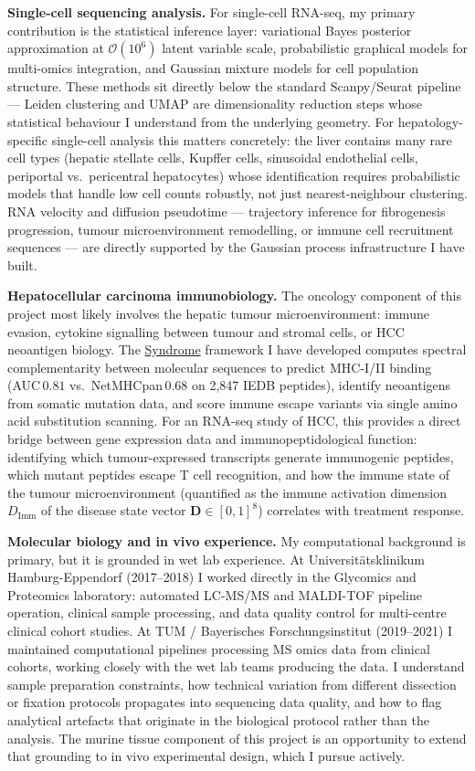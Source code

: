 \documentclass[12pt,a4paper]{article}
\begin{document}
\textbf{Single-cell sequencing analysis.}
For single-cell RNA-seq, my primary contribution is the statistical
inference layer: variational Bayes posterior approximation at
$\mathcal{O}(10^6)$ latent variable scale, probabilistic graphical
models for multi-omics integration, and Gaussian mixture models for
cell population structure.
These methods sit directly below the standard Scanpy/Seurat pipeline ---
Leiden clustering and UMAP are dimensionality reduction steps whose
statistical behaviour I understand from the underlying geometry.
For hepatology-specific single-cell analysis this matters concretely:
the liver contains many rare cell types (hepatic stellate cells,
Kupffer cells, sinusoidal endothelial cells, periportal vs.\ pericentral
hepatocytes) whose identification requires probabilistic models that
handle low cell counts robustly, not just nearest-neighbour clustering.
RNA velocity and diffusion pseudotime --- trajectory inference for
fibrogenesis progression, tumour microenvironment remodelling, or
immune cell recruitment sequences --- are directly supported by the
Gaussian process infrastructure I have built.

\textbf{Hepatocellular carcinoma immunobiology.}
The oncology component of this project most likely involves the
hepatic tumour microenvironment: immune evasion, cytokine signalling
between tumour and stromal cells, or HCC neoantigen biology.
The \href{https://syndrome-seven.vercel.app/tools}{Syndrome} framework
I have developed computes spectral complementarity between molecular
sequences to predict MHC-I/II binding (AUC\,$0.81$ vs.\ NetMHCpan\,$0.68$
on 2,847 IEDB peptides), identify neoantigens from somatic mutation
data, and score immune escape variants via single amino acid substitution scanning.
For an RNA-seq study of HCC, this provides a direct bridge between
gene expression data and immunopeptidological function: identifying
which tumour-expressed transcripts generate immunogenic peptides,
which mutant peptides escape T cell recognition, and how the immune
state of the tumour microenvironment (quantified as the immune activation
dimension $D_\mathrm{Imm}$ of the disease state vector $\mathbf{D}\in[0,1]^8$)
correlates with treatment response.

\textbf{Molecular biology and in vivo experience.}
My computational background is primary, but it is grounded in wet lab
experience.
At Universitätsklinikum Hamburg-Eppendorf (2017--2018) I worked directly
in the Glycomics and Proteomics laboratory: automated LC-MS/MS and
MALDI-TOF pipeline operation, clinical sample processing, and data
quality control for multi-centre clinical cohort studies.
At TUM / Bayerisches Forschungsinstitut (2019--2021) I maintained
computational pipelines processing MS omics data from clinical cohorts,
working closely with the wet lab teams producing the data.
I understand sample preparation constraints, how technical variation
from different dissection or fixation protocols propagates into
sequencing data quality, and how to flag analytical artefacts that
originate in the biological protocol rather than the analysis.
The murine tissue component of this project is an opportunity to extend
that grounding to in vivo experimental design, which I pursue actively.
\end{document}
